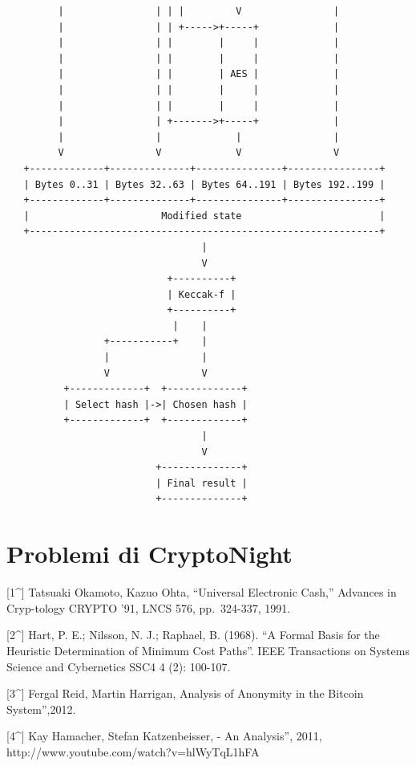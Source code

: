 \documentclass[
]{article}
\begin{document}
\begin{verbatim}
         |                | | |         V                |
         |                | | +----->+-----+             |
         |                | |        |     |             |
         |                | |        |     |             |
         |                | |        | AES |             |
         |                | |        |     |             |
         |                | |        |     |             |
         |                | +------->+-----+             |
         |                |             |                |
         V                V             V                V
   +-------------+--------------+---------------+----------------+
   | Bytes 0..31 | Bytes 32..63 | Bytes 64..191 | Bytes 192..199 |
   +-------------+--------------+---------------+----------------+
   |                       Modified state                        |
   +-------------------------------------------------------------+
                                  |
                                  V
                            +----------+
                            | Keccak-f |
                            +----------+
                             |    |
                 +-----------+    |
                 |                |
                 V                V
          +-------------+  +-------------+
          | Select hash |->| Chosen hash |
          +-------------+  +-------------+
                                  |
                                  V
                          +--------------+
                          | Final result |
                          +--------------+
\end{verbatim}

\section{Problemi di CryptoNight}\label{problemi-di-cryptonight}

{[}1\^{}{]} Tatsuaki Okamoto, Kazuo Ohta, ``Universal Electronic Cash,''
Advances in Cryp-tology \textbar{} CRYPTO '91, LNCS 576, pp.~324-337,
1991.

{[}2\^{}{]} Hart, P. E.; Nilsson, N. J.; Raphael, B. (1968). ``A Formal
Basis for the Heuristic Determination of Minimum Cost Paths''. IEEE
Transactions on Systems Science and Cybernetics SSC4 4 (2): 100-107.

{[}3\^{}{]} Fergal Reid, Martin Harrigan, \An Analysis of Anonymity in
the Bitcoin System'',2012.

{[}4\^{}{]} Kay Hamacher, Stefan Katzenbeisser, \Bitcoin - An
Analysis'', 2011, http://www.youtube.com/watch?v=hlWyTqL1hFA
\end{document}
